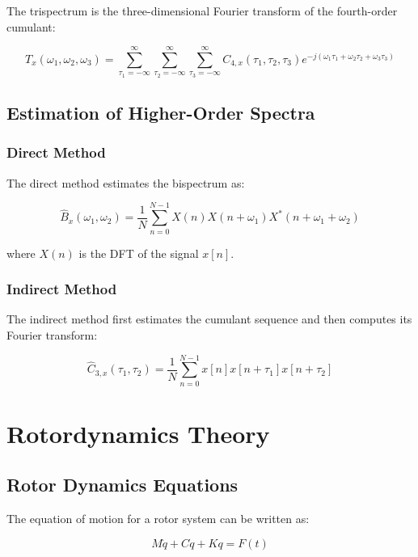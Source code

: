 The trispectrum is the three-dimensional Fourier transform of the fourth-order cumulant:

\begin{equation}
T_x(\omega_1, \omega_2, \omega_3) = \sum_{\tau_1=-\infty}^{\infty} \sum_{\tau_2=-\infty}^{\infty} \sum_{\tau_3=-\infty}^{\infty} C_{4,x}(\tau_1, \tau_2, \tau_3) e^{-j(\omega_1\tau_1 + \omega_2\tau_2 + \omega_3\tau_3)}
\end{equation}

\subsection{Estimation of Higher-Order Spectra}

\subsubsection{Direct Method}

The direct method estimates the bispectrum as:

\begin{equation}
\hat{B}_x(\omega_1, \omega_2) = \frac{1}{N} \sum_{n=0}^{N-1} X(n)X(n+\omega_1)X^*(n+\omega_1+\omega_2)
\end{equation}

where $X(n)$ is the DFT of the signal $x[n]$.

\subsubsection{Indirect Method}

The indirect method first estimates the cumulant sequence and then computes its Fourier transform:

\begin{equation}
\hat{C}_{3,x}(\tau_1, \tau_2) = \frac{1}{N} \sum_{n=0}^{N-1} x[n]x[n+\tau_1]x[n+\tau_2]
\end{equation}

\section{Rotordynamics Theory}

\subsection{Rotor Dynamics Equations}

The equation of motion for a rotor system can be written as:

\begin{equation}
M\ddot{q} + C\dot{q} + Kq = F(t)
\end{equation}

